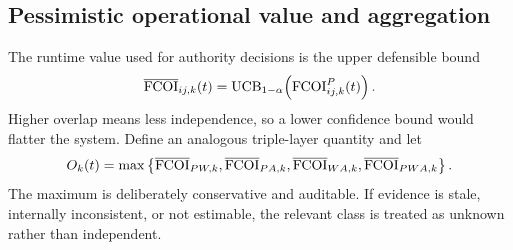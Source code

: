 \subsection{Pessimistic operational value and aggregation}
The runtime value used for authority decisions is the upper defensible bound
\begin{equation}
\overline{\operatorname{FCOI}}_{ij,k}(t)=
\operatorname{UCB}_{1-\alpha}\!\left(\operatorname{FCOI}^{P}_{ij,k}(t)\right).
\label{eq:ucb}
\end{equation}
Higher overlap means less independence, so a lower confidence bound would flatter the system. Define an analogous triple-layer quantity and let
\begin{equation}
O_k(t)=\max\left\{
\overline{\operatorname{FCOI}}_{PW,k},
\overline{\operatorname{FCOI}}_{PA,k},
\overline{\operatorname{FCOI}}_{WA,k},
\overline{\operatorname{FCOI}}_{PWA,k}
\right\}.
\label{eq:aggregate}
\end{equation}
The maximum is deliberately conservative and auditable. If evidence is stale, internally inconsistent, or not estimable, the relevant class is treated as unknown rather than independent.
